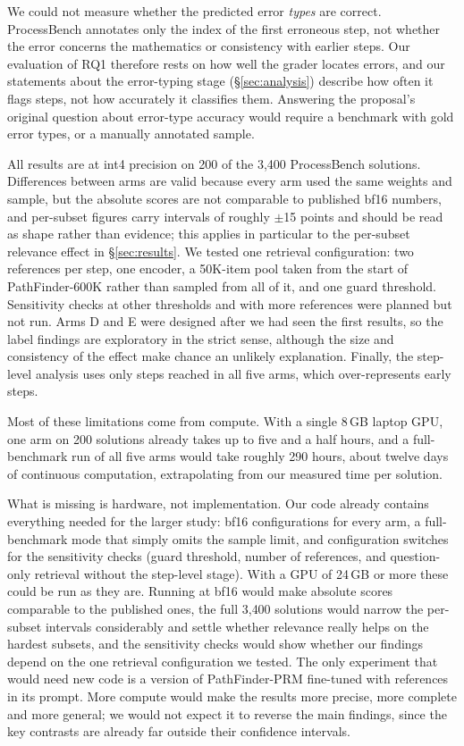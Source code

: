 \documentclass[11pt]{article}
\newcommand{\arm}[1]{\textsc{#1}}
\begin{document}
We could not measure whether the predicted error \emph{types} are correct. ProcessBench
annotates only the index of the first erroneous step, not whether the error concerns the
mathematics or consistency with earlier steps. Our evaluation of RQ1 therefore rests on how well
the grader locates errors, and our statements about the error-typing stage (\S\ref{sec:analysis})
describe how often it flags steps, not how accurately it classifies them. Answering the
proposal's original question about error-type accuracy would require a benchmark with gold
error types, or a manually annotated sample.

All results are at int4 precision on 200 of the 3{,}400 ProcessBench solutions. Differences
between arms are valid because every arm used the same weights and sample, but the absolute
scores are not comparable to published bf16 numbers, and per-subset figures carry intervals of
roughly $\pm$15 points and should be read as shape rather than evidence; this applies in
particular to the per-subset relevance effect in \S\ref{sec:results}. We tested one retrieval
configuration: two references per step, one encoder, a 50K-item pool taken from the start of
PathFinder-600K rather than sampled from all of it, and one guard threshold. Sensitivity checks
at other thresholds and with more references were planned but not run. Arms \arm{D} and \arm{E}
were designed after we had seen the first results, so the label findings are exploratory in the
strict sense, although the size and consistency of the effect make chance an unlikely
explanation. Finally, the step-level analysis uses only steps reached in all five arms, which
over-represents early steps.

Most of these limitations come from compute. With a single 8\,GB laptop GPU, one arm on
200 solutions already takes up to five and a half hours, and a full-benchmark run of all five
arms would take roughly 290 hours, about twelve days of continuous computation, extrapolating
from our measured time per solution.

What is missing is hardware, not implementation. Our code already contains everything needed
for the larger study: bf16 configurations for every arm, a full-benchmark mode that simply omits
the sample limit, and configuration switches for the sensitivity checks (guard threshold,
number of references, and question-only retrieval without the step-level stage). With a GPU of
24\,GB or more these could be run as they are. Running at bf16 would make absolute scores
comparable to the published ones, the full 3{,}400 solutions would narrow the per-subset
intervals considerably and settle whether relevance really helps on the hardest subsets, and the
sensitivity checks would show whether our findings depend on the one retrieval configuration we
tested. The only experiment that would need new code is a version of PathFinder-PRM fine-tuned
with references in its prompt. More compute would make the results more precise, more complete
and more general; we would not expect it to reverse the main findings, since the key contrasts
are already far outside their confidence intervals.
\end{document}
